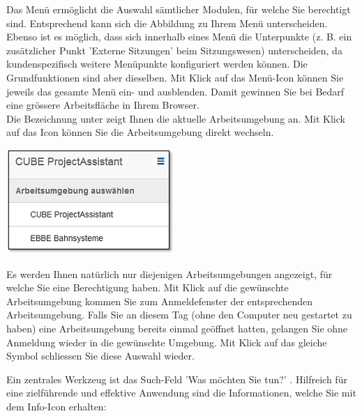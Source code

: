 Das Menü ermöglicht die Auswahl sämtlicher Modulen, für welche Sie berechtigt sind. Entsprechend kann sich die Abbildung zu Ihrem Menü unterscheiden. Ebenso ist es möglich, dass sich innerhalb eines Menü die Unterpunkte (z. B. ein zusätzlicher Punkt 'Externe Sitzungen' beim Sitzungswesen) unterscheiden, da kundenspezifisch weitere Menüpunkte konfiguriert werden können. Die Grundfunktionen sind aber dieselben. Mit Klick auf das Menü-Icon  können Sie jeweils das gesamte Menü ein- und ausblenden. Damit gewinnen Sie bei Bedarf eine grössere Arbeitsfläche in Ihrem Browser. \\
Die Bezeichnung unter  zeigt Ihnen die aktuelle Arbeitsumgebung an. Mit Klick auf das Icon  können Sie die Arbeitsumgebung direkt wechseln. 

\vspace{\baselineskip}

\begin{raggedleft}
\hspace{80mm} \includegraphics[height=40mm]{../chapters/02_GettingStarted/pictures/2-5-1_Arbeitsumgebung_wechseln.jpg}
\end{raggedleft}

\vspace{\baselineskip}

Es werden Ihnen natürlich nur diejenigen Arbeitsumgebungen angezeigt, für welche Sie eine Berechtigung haben. Mit Klick auf die gewünschte Arbeitsumgebung kommen Sie zum Anmeldefenster der entsprechenden Arbeitsumgebung. Falls Sie an diesem Tag (ohne den Computer neu gestartet zu haben) eine Arbeitsumgebung bereits einmal geöffnet hatten, gelangen Sie ohne Anmeldung wieder in die gewünschte Umgebung. Mit Klick auf das gleiche Symbol  schliessen Sie diese Auswahl wieder. 

\vspace{\baselineskip}

Ein zentrales Werkzeug ist das Such-Feld 'Was möchten Sie tun?' . Hilfreich für eine zielführende und effektive Anwendung sind die Informationen, welche Sie mit dem Info-Icon  erhalten:

